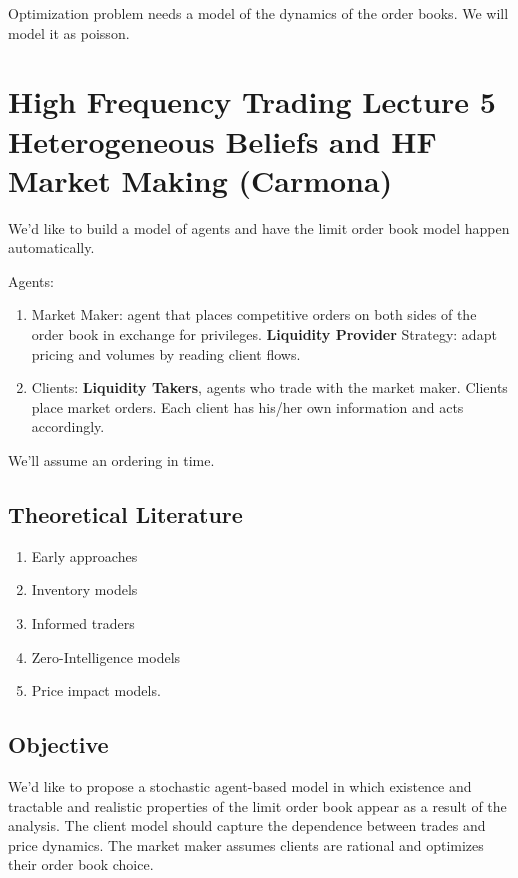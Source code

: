Optimization problem needs a model of the dynamics of the order books. We will model it as poisson.

\chapter{High Frequency Trading Lecture 5 \\ Heterogeneous Beliefs and HF Market Making (Carmona)}
We'd like to build a model of agents and have the limit order book model happen  automatically.

Agents:
\begin{enumerate}
	\item Market Maker: agent that places competitive orders on both sides of the order book in exchange for privileges. {\bf Liquidity Provider} Strategy: adapt pricing and volumes by reading client flows.
	
	\item Clients: {\bf Liquidity Takers}, agents who trade with the market maker. Clients place market orders. Each client has his/her own information and acts accordingly.
\end{enumerate}
We'll assume an ordering in time.

\section{Theoretical Literature}
\begin{enumerate}
	\item Early approaches
	\item Inventory models
	\item Informed traders
	\item Zero-Intelligence models
	\item Price impact models.
\end{enumerate}

\section{Objective}
We'd like to propose a stochastic agent-based model in which existence and tractable and realistic properties of the limit order book appear as a result of the analysis. The client model should capture the dependence between trades and price dynamics. The market maker assumes clients are rational and optimizes their order book choice.


